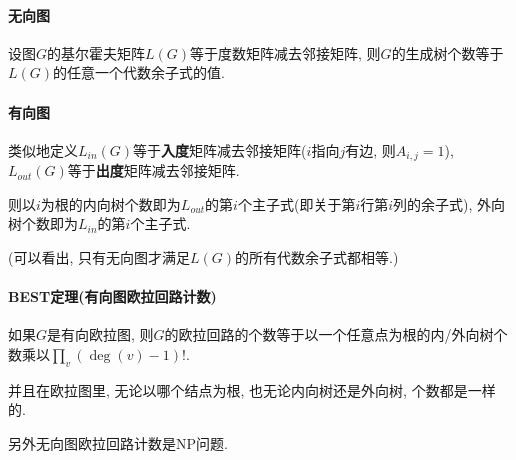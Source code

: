 \paragraph{无向图}设图$G$的基尔霍夫矩阵$L(G)$等于度数矩阵减去邻接矩阵, 则$G$的生成树个数等于$L(G)$的任意一个代数余子式的值.

\paragraph{有向图}类似地定义$L_{in}(G)$等于\textbf{入度}矩阵减去邻接矩阵($i$指向$j$有边, 则$A_{i, j} = 1$), $L_{out}(G)$等于\textbf{出度}矩阵减去邻接矩阵.

则以$i$为根的内向树个数即为$L_{out}$的第$i$个主子式(即关于第$i$行第$i$列的余子式), 外向树个数即为$L_{in}$的第$i$个主子式.

(可以看出, 只有无向图才满足$L(G)$的所有代数余子式都相等.)

\paragraph{BEST定理(有向图欧拉回路计数)}如果$G$是有向欧拉图, 则$G$的欧拉回路的个数等于以一个任意点为根的内/外向树个数乘以$\prod_v (\deg(v) - 1) !$.

并且在欧拉图里, 无论以哪个结点为根, 也无论内向树还是外向树, 个数都是一样的.

另外无向图欧拉回路计数是NP问题.